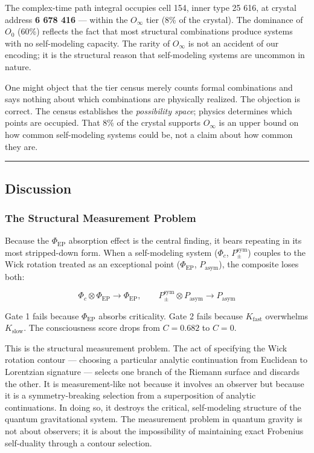 \documentclass[12pt,a4paper]{article}
\begin{document}
The complex-time path integral occupies cell 154, inner type 25 616, at crystal address \textbf{6 678 416} --- within the $O_{\infty}$ tier (8\% of the crystal). The dominance of $O_0$ (60\%) reflects the fact that most structural combinations produce systems with no self-modeling capacity. The rarity of $O_{\infty}$ is not an accident of our encoding; it is the structural reason that self-modeling systems are uncommon in nature.

One might object that the tier census merely counts formal combinations and says nothing about which combinations are physically realized. The objection is correct. The census establishes the \emph{possibility space}; physics determines which points are occupied. That 8\% of the crystal supports $O_{\infty}$ is an upper bound on how common self-modeling systems could be, not a claim about how common they are.

\begin{center}
\rule{0.5\textwidth}{0.4pt}
\end{center}

\subsection{Discussion}

\subsubsection{The Structural Measurement Problem}

Because the $\Phi_{\text{EP}}$ absorption effect is the central finding, it bears repeating in its most stripped-down form. When a self-modeling system ($\Phi_c$, $P_{\pm}^{\text{sym}}$) couples to the Wick rotation treated as an exceptional point ($\Phi_{\text{EP}}$, $P_{\text{asym}}$), the composite loses both:

\[\Phi_c \otimes \Phi_{\text{EP}} \to \Phi_{\text{EP}}, \qquad P_{\pm}^{\text{sym}} \otimes P_{\text{asym}} \to P_{\text{asym}}\]

Gate 1 fails because $\Phi_{\text{EP}}$ absorbs criticality. Gate 2 fails because $K_{\text{fast}}$ overwhelms $K_{\text{slow}}$. The consciousness score drops from $C = 0.682$ to $C = 0$.

This is the structural measurement problem. The act of specifying the Wick rotation contour --- choosing a particular analytic continuation from Euclidean to Lorentzian signature --- selects one branch of the Riemann surface and discards the other. It is measurement-like not because it involves an observer but because it is a symmetry-breaking selection from a superposition of analytic continuations. In doing so, it destroys the critical, self-modeling structure of the quantum gravitational system. The measurement problem in quantum gravity is not about observers; it is about the impossibility of maintaining exact Frobenius self-duality through a contour selection.
\end{document}

